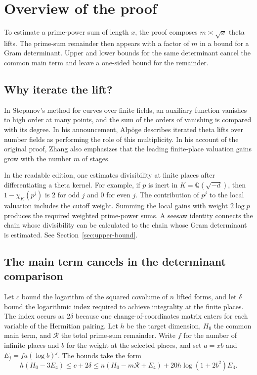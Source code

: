 \section*{Overview of the proof}
\label{sec:overview}

To estimate a prime-power sum of length \(x\), the proof composes
\(m\asymp\sqrt{x}\) theta lifts. The prime-sum remainder then appears with
a factor of \(m\) in a bound for a Gram determinant. Upper and lower bounds
for the same determinant cancel the common main term and leave a one-sided
bound for the remainder.

\subsection*{Why iterate the lift?}

In Stepanov's method for curves over finite fields, an auxiliary function
vanishes to high order at many points, and the sum of the orders of
vanishing is compared with its degree. In his announcement, Alpöge
describes iterated theta lifts over number fields as performing the role
of this multiplicity. In his account of the original proof, Zhang
also emphasizes that the leading finite-place valuation gains grow with
the number \(m\) of stages. \cite[pp.~1, 4]{alpoege} \cite[Section~4]{zhang}

In the readable edition, one estimates divisibility at finite places
after differentiating a theta kernel. For example, if \(p\) is inert
in \(K=\mathbb Q(\sqrt{-d})\), then \(1-\chi_K(p^j)\) is \(2\) for odd
\(j\) and \(0\) for even \(j\). The contribution of \(p^j\) to the local
valuation includes the cutoff weight. Summing the local gains with weight
\(2\log p\) produces the required weighted prime-power sums. A seesaw
identity connects the chain whose divisibility can be calculated to the
chain whose Gram determinant is estimated.
See Section~\ref{sec:upper-bound}.

\subsection*{The main term cancels in the determinant comparison}

Let \(c\) bound the logarithm of the squared covolume of \(n\) lifted
forms, and let \(\delta\) bound the logarithmic index required to achieve
integrality at the finite places. The index occurs as \(2\delta\)
because one change-of-coordinates matrix enters for each variable of
the Hermitian pairing. Let \(h\) be the target dimension, \(H_0\) the
common main term, and \(\mathcal R\) the total prime-sum remainder.
Write \(f\) for the number of infinite places and \(b\) for the weight
at the selected places, and set \(a=xb\) and \(E_j=fa(\log b)^j\).
The bounds take the form
\[
 h(H_0-3E_4)
 \le c+2\delta
 \le n(H_0-m\mathcal R+E_4)
     +20h\log(1+2b^2)E_3 .
\]

